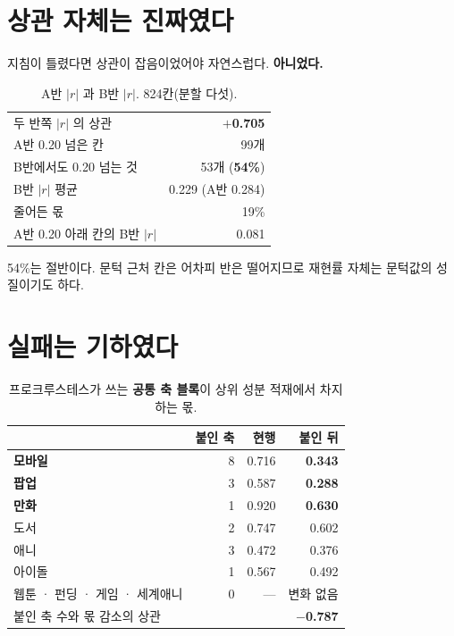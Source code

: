 \documentclass[10pt]{article}
\begin{document}

\section{상관 자체는 진짜였다}

지침이 틀렸다면 상관이 잡음이었어야 자연스럽다. \textbf{아니었다.}

\begin{table}[t]
\centering\tsize
\caption{A반 $|r|$ 과 B반 $|r|$. 824칸(분할 다섯).}
\begin{tabular}{lr}
\toprule
두 반쪽 $|r|$ 의 상관 & \textbf{$+$0.705} \\
A반 0.20 넘은 칸 & 99개 \\
\quad B반에서도 0.20 넘는 것 & 53개 (\textbf{54\%}) \\
\quad B반 $|r|$ 평균 & 0.229 (A반 0.284) \\
\quad 줄어든 몫 & 19\% \\
A반 0.20 아래 칸의 B반 $|r|$ & 0.081 \\
\bottomrule
\end{tabular}
\end{table}

{54\%는 절반이다. 문턱 근처 칸은 어차피 반은 떨어지므로 재현률 자체는
문턱값의 성질이기도 하다.}

\section{실패는 기하였다}

\begin{table}[t]
\centering\tsize
\caption{프로크루스테스가 쓰는 \textbf{공통 축 블록}이 상위 성분 적재에서
차지하는 몫.}
\begin{tabular}{lrrr}
\toprule
& 붙인 축 & 현행 & 붙인 뒤 \\
\midrule
\textbf{모바일} & 8 & 0.716 & \textbf{0.343} \\
\textbf{팝업} & 3 & 0.587 & \textbf{0.288} \\
\textbf{만화} & 1 & 0.920 & \textbf{0.630} \\
도서 & 2 & 0.747 & 0.602 \\
애니 & 3 & 0.472 & 0.376 \\
아이돌 & 1 & 0.567 & 0.492 \\
웹툰 · 펀딩 · 게임 · 세계애니 & 0 & --- & 변화 없음 \\
\midrule
\multicolumn{3}{l}{붙인 축 수와 몫 감소의 상관} & \textbf{$-$0.787} \\
\bottomrule
\end{tabular}
\end{table}
\end{document}
